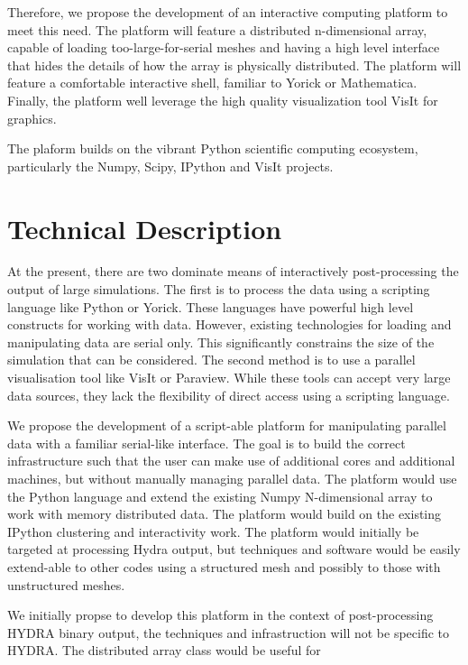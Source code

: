 \documentclass[a4paper]{article}
\begin{document}
Therefore, we propose the development of an interactive computing platform to meet this need.  The platform will feature a distributed n-dimensional array, capable of loading too-large-for-serial meshes and having a high level interface that hides the details of how the array is physically distributed.  The platform will feature a comfortable interactive shell, familiar to Yorick or Mathematica.  Finally, the platform well leverage the high quality visualization tool VisIt for graphics.

The plaform builds on the vibrant Python scientific computing ecosystem, particularly the Numpy\cite{numpysciyp}, Scipy, IPython\cite{ipython} and VisIt\cite{visit} projects.


\section*{Technical Description}

At the present, there are two dominate means of interactively post-processing the output of large simulations.  The first is to process the data using a scripting language like Python or Yorick.  These languages have powerful high level constructs for working with data.  However, existing technologies for loading and manipulating data are serial only.  This significantly constrains the size of the simulation that can be considered.  The second method is to use a parallel visualisation tool like VisIt or Paraview.  While these tools can accept very large data sources, they lack the flexibility of direct access using a scripting language.

We propose the development of a script-able platform for manipulating parallel data with a familiar serial-like interface.  The goal is to build the correct infrastructure such that the user can make use of additional cores and additional machines, but without manually managing parallel data.  The platform would use the Python language and extend the existing Numpy N-dimensional array to work with memory distributed data.  The platform would build on the existing IPython clustering and interactivity work.  The platform would initially be targeted at processing Hydra output, but techniques and software would be easily extend-able to other codes using a structured mesh and possibly to those with unstructured meshes.

We initially propse to develop this platform in the context of post-processing HYDRA binary output, the techniques and infrastruction will not be specific to HYDRA\@.  The distributed array class would be useful for 
\end{document}
